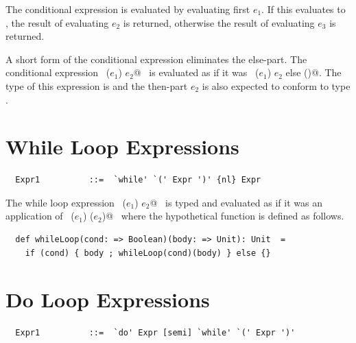 The conditional expression is evaluated by evaluating first
$e_1$. If this evaluates to , the result of
evaluating $e_2$ is returned, otherwise the result of
evaluating $e_3$ is returned.

A short form of the conditional expression eliminates the
else-part. The conditional expression ~\lstinline@if ($e_1$) $e_2$@~ is
evaluated as if it was ~\lstinline@if ($e_1$) $e_2$ else ()@.  The type of
this expression is  and the then-part
$e_2$ is also expected to conform to type .

\section{While Loop Expressions}\label{sec:while}

\syntax\begin{lstlisting}
  Expr1          ::=  `while' `(' Expr ')' {nl} Expr
\end{lstlisting}

The while loop expression ~\lstinline@while ($e_1$) $e_2$@~ is typed and
evaluated as if it was an application of ~\lstinline@whileLoop ($e_1$) ($e_2$)@~ where
the hypothetical function  is defined as follows.

\begin{lstlisting}
  def whileLoop(cond: => Boolean)(body: => Unit): Unit  =
    if (cond) { body ; whileLoop(cond)(body) } else {}
\end{lstlisting}


\section{Do Loop Expressions}

\syntax\begin{lstlisting}
  Expr1          ::=  `do' Expr [semi] `while' `(' Expr ')'
\end{lstlisting}

